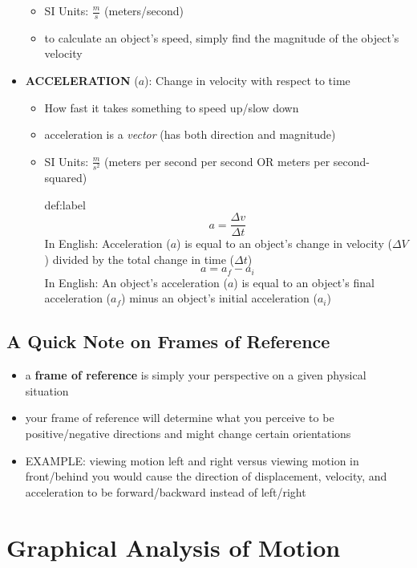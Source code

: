 \documentclass{package/notes}
\begin{document}
\begin{itemize}
\begin{itemize}
		\item SI Units: $\frac{m}{s}$ (meters/second)
		\item to calculate an object's speed, simply find the magnitude of the object's velocity
	\end{itemize}
	\item \textbf{ACCELERATION} ($a$): Change in velocity with respect to time
	\begin{itemize}
		\item How fast it takes something to speed up/slow down
		\item acceleration is a \textit{vector} (has both direction and magnitude)
		\item SI Units: $\frac{m}{s^2}$ (meters per second per second OR meters per second-squared)
		\begin{definition}{def:label}
			$$a = \frac{\Delta v}{\Delta t}$$
			In English: Acceleration ($a$) is equal to an object's change in velocity ($\Delta V$) divided by the total change in time ($\Delta t$)
			$$a = a_f - a_i$$
			In English: An object's acceleration ($a$) is equal to an object's final acceleration ($a_f$) minus an object's initial acceleration ($a_i$) 
		\end{definition}
	\end{itemize}
\end{itemize}


\subsection{A Quick Note on Frames of Reference}

\begin{itemize}
	\item a \textbf{frame of reference} is simply your perspective on a given physical situation
	\item your frame of reference will determine what you perceive to be positive/negative directions and might change certain orientations
	\item EXAMPLE: viewing motion left and right versus viewing motion in front/behind you would cause the direction of displacement, velocity, and acceleration to be forward/backward instead of left/right
\end{itemize}\newpage

\section{Graphical Analysis of Motion}
\end{document}
